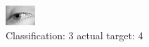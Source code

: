 \begin{figure}[h!]
\begin{center}
\includegraphics[width=0.60\columnwidth]{figures/ID2976_class_3_target_4.png}
\end{center}
\caption{ Classification: 3 actual target: 4}
\label{fig:ID2976_class_3_target_4}
\end{figure}
